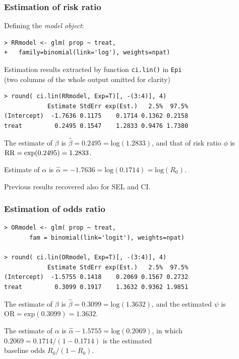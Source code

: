 \documentclass[handout,12pt]{beamer}
\begin{document}
\begin{frame}[fragile]
 \frametitle{Estimation of risk ratio}
 
\bi
\item Defining the {\it model object}: 
\small
\begin{verbatim}
> RRmodel <- glm( prop ~ treat, 
+   family=binomial(link='log'), weights=npat)
\end{verbatim}
\normalsize
\item Estimation results extracted by function {\tt ci.lin()} in {\tt Epi}\\
(two columns of the whole output omitted for clarity)\small
\begin{verbatim}
> round( ci.lin(RRmodel, Exp=T)[, -(3:4)], 4)
            Estimate StdErr exp(Est.)   2.5%  97.5%
(Intercept)  -1.7636 0.1175    0.1714 0.1362 0.2158
treat         0.2495 0.1547    1.2833 0.9476 1.7380
\end{verbatim} 
\normalsize
\medskip
\item The estimate of $\beta$ is $\widehat\beta = 0.2495 = \text{log}(1.2833)$, and that of risk ratio $\phi$ is $\text{\rm RR} = \text{exp}(0.2495) = 1.2833$.\medskip
\item Estimate of $\alpha$ is 
$\widehat\alpha = -1.7636 = \text{log}(0.1714) = \text{log}(R_0)$.\medskip
\item Previous results recovered also for SEL and CI.
\ei
\end{frame}


\begin{frame}[fragile] \frametitle{Estimation of odds ratio}

\small
\begin{verbatim}
> ORmodel <- glm( prop ~ treat, 
       fam = binomial(link='logit'), weights=npat)
       
> round( ci.lin(ORmodel, Exp=T)[, -(3:4)], 4)
            Estimate StdErr exp(Est.)   2.5%  97.5%
(Intercept)  -1.5755 0.1418    0.2069 0.1567 0.2732
treat         0.3099 0.1917    1.3632 0.9362 1.9851
\end{verbatim}
\normalsize
\bi
\item The estimate of $\beta$ is $\widehat\beta = 0.3099 = \text{log}(1.3632)$, and the estimated $\psi$ is 
      $\text{OR} = \text{exp}(0.3099) = 1.3632$.
      \medskip
\item The estimate of $\alpha$ is $\widehat\alpha -1.5755 = \text{log}(0.2069)$, in which\\
      $0.2069 = 0.1714/(1 - 0.1714)$ is the estimated\\
      baseline odds $R_0/(1 - R_0)$.
\ei
\end{frame} 
\end{document}
